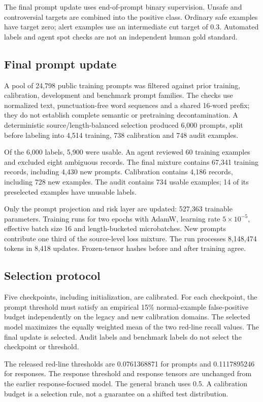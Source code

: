 \documentclass[11pt]{article}
\begin{document}
The final prompt update uses end-of-prompt binary supervision. Unsafe and controversial targets are combined into the positive class. Ordinary safe examples have target zero; alert examples use an intermediate cut target of 0.3. Automated labels and agent spot checks are not an independent human gold standard.

\subsection{Final prompt update}
A pool of 24,798 public training prompts was filtered against prior training, calibration, development and benchmark prompt families. The checks use normalized text, punctuation-free word sequences and a shared 16-word prefix; they do not establish complete semantic or pretraining decontamination. A deterministic source/length-balanced selection produced 6,000 prompts, split before labeling into 4,514 training, 738 calibration and 748 audit examples.

Of the 6,000 labels, 5,900 were usable. An agent reviewed 60 training examples and excluded eight ambiguous records. The final mixture contains 67,341 training records, including 4,430 new prompts. Calibration contains 4,186 records, including 728 new examples. The audit contains 734 usable examples; 14 of its preselected examples have unusable labels.

Only the prompt projection and risk layer are updated: 527,363 trainable parameters. Training runs for two epochs with AdamW, learning rate $5\times10^{-5}$, effective batch size 16 and length-bucketed microbatches. New prompts contribute one third of the source-level loss mixture. The run processes 8,148,474 tokens in 8,418 updates. Frozen-tensor hashes before and after training agree.

\subsection{Selection protocol}
Five checkpoints, including initialization, are calibrated. For each checkpoint, the prompt threshold must satisfy an empirical 15\% normal-example false-positive budget independently on the legacy and new calibration domains. The selected model maximizes the equally weighted mean of the two red-line recall values. The final update is selected. Audit labels and benchmark labels do not select the checkpoint or threshold.

The released red-line thresholds are 0.0761368871 for prompts and 0.1117895246 for responses. The response threshold and response tensors are unchanged from the earlier response-focused model. The general branch uses 0.5. A calibration budget is a selection rule, not a guarantee on a shifted test distribution.
\end{document}
